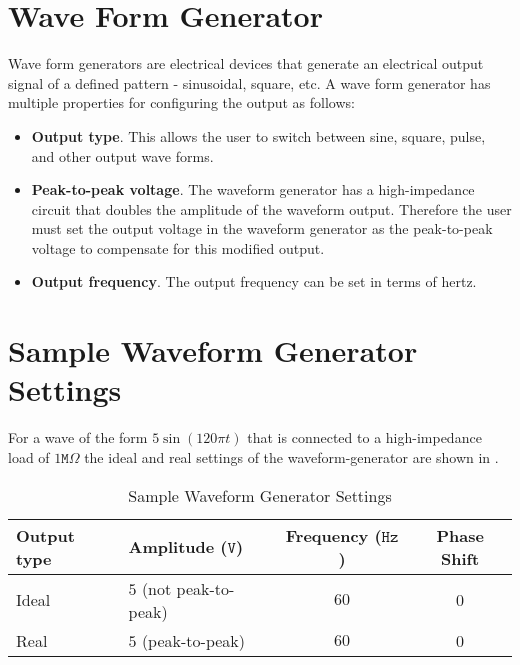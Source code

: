 \documentclass[main.tex]{subfile}
\begin{document}
\section{Wave Form Generator} 
\label{sec:wave_form_generator}

Wave form generators are electrical devices that generate an electrical output
signal of a defined pattern - sinusoidal, square, etc. A wave form generator has
multiple properties for configuring the output as follows: 

\begin{itemize}
\item \textbf{Output type}. This allows the user to switch between sine, square, pulse,
	and other output wave forms. 
\item \textbf{Peak-to-peak voltage}. The waveform generator has a high-impedance circuit
	that doubles the amplitude of the waveform output. Therefore the user must set
	the output voltage in the waveform generator as the peak-to-peak voltage to
	compensate for this modified output.
\item \textbf{Output frequency}. The output frequency can be set in terms of
	hertz.
\end{itemize}

\section{Sample Waveform Generator Settings} 
\label{sec:sample_waveform_generator_settings}

For a wave of the form $5\sin({120{\pi}t})$ that is connected to a high-impedance
load of $1\texttt{M}\Omega$ the ideal and real settings of the waveform-generator
are shown in .

\begin{table}[H]
  \begin{center}
    \caption{Sample Waveform Generator Settings}
    \label{tab:genSettings}
    \begin{tabular}{llcc}
      \\ \toprule
			Output type & Amplitude ($\texttt{V}$) & Frequency ($\texttt{Hz}$) & Phase
			Shift
      \\ \midrule
			Ideal & $5$ (not peak-to-peak) & $60$ & 0
			\\ Real  & $5$ (peak-to-peak) & $60$ & 0
      \\ \bottomrule
    \end{tabular}
  \end{center}
\end{table}
\end{document}
